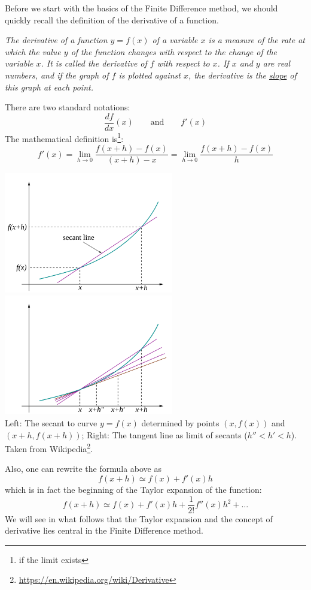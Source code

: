 Before we start with the basics of the Finite Difference method, we should quickly recall the definition 
of the derivative of a function. 

\begin{center}
{\sl 
The derivative of a function $y=f(x)$ of a variable $x$ is a measure of the rate at which the value $y$ 
of the function changes with respect to the change of the variable $x$. It is called the derivative of $f$ 
with respect to $x$. If $x$ and $y$ are real numbers, and if the graph of $f$ is plotted against $x$, the derivative 
is the \underline{slope} of this graph at each point. 
}
\end{center}

\noindent There are two standard notations:
\[
\frac{df}{dx}(x) \qquad \text{and} \qquad f'(x)
\]
The mathematical definition is\footnote{if the limit exists}:
\[
\boxed{
f'(x)
=\lim_{h\rightarrow 0} \frac{f(x+h)-f(x)}{(x+h)-x} 
=\lim_{h\rightarrow 0} \frac{f(x+h)-f(x)}{h} 
}
\]

\begin{center}
\includegraphics[width=7.4cm]{images/derivative/der2}
\includegraphics[width=7.4cm]{images/derivative/der1}\\
{\captionfont 
Left: The secant to curve $y=f(x)$ determined by points $(x,f(x))$ and $(x+h, f(x+h))$;
Right: The tangent line as limit of secants ($h''<h'<h$).
Taken from Wikipedia\footnote{\url{https://en.wikipedia.org/wiki/Derivative}}.
}
\end{center}

Also, one can rewrite the formula above as
\[
f(x+h) \simeq f(x) +  f'(x) h
\]
which is in fact the beginning of the Taylor expansion of the function:
\[
f(x+h) \simeq f(x) +  f'(x) h + \frac{1}{2!} f''(x) h^2 + \dots 
\]
We will see in what follows that the Taylor expansion and the concept of derivative lies 
central in the Finite Difference method. 

